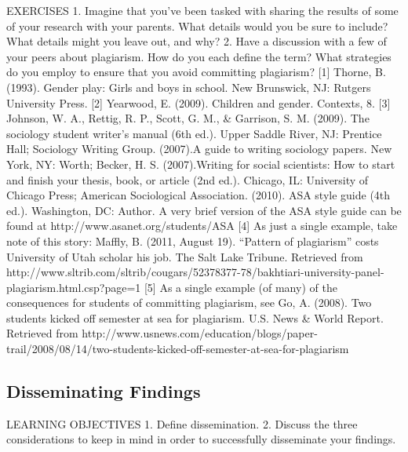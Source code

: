 EXERCISES
1. Imagine that you’ve been tasked with sharing the results of some of your research with your parents. What details would you be sure to include? What details might you leave out, and why?
2. Have a discussion with a few of your peers about plagiarism. How do you each define the term? What strategies do you employ to ensure that you avoid committing plagiarism?
[1] Thorne, B. (1993). Gender play: Girls and boys in school. New Brunswick, NJ: Rutgers University Press.
[2] Yearwood, E. (2009). Children and gender. Contexts, 8.
[3] Johnson, W. A., Rettig, R. P., Scott, G. M., \& Garrison, S. M. (2009). The sociology student writer’s manual (6th ed.). Upper Saddle River, NJ: Prentice Hall; Sociology Writing Group. (2007).A guide to writing sociology papers. New York, NY: Worth; Becker, H. S. (2007).Writing for social
scientists: How to start and finish your thesis, book, or article (2nd ed.). Chicago, IL: University of Chicago Press; American Sociological Association. (2010). ASA style guide (4th ed.). Washington, DC: Author. A very brief version of the ASA style guide can be found at http://www.asanet.org/students/ASA%
[4] As just a single example, take note of this story: Maffly, B. (2011, August 19). “Pattern of plagiarism” costs University of Utah scholar his job. The Salt Lake Tribune. Retrieved from http://www.sltrib.com/sltrib/cougars/52378377-78/bakhtiari-university-panel-plagiarism.html.csp?page=1
[5] As a single example (of many) of the consequences for students of committing plagiarism, see Go, A. (2008). Two students kicked off semester at sea for plagiarism. U.S. News \& World Report. Retrieved from http://www.usnews.com/education/blogs/paper-trail/2008/08/14/two-students-kicked-off-semester-at-sea-for-plagiarism

\subsection{Disseminating Findings}

LEARNING OBJECTIVES
1. Define dissemination.
2. Discuss the three considerations to keep in mind in order to successfully disseminate your findings.

